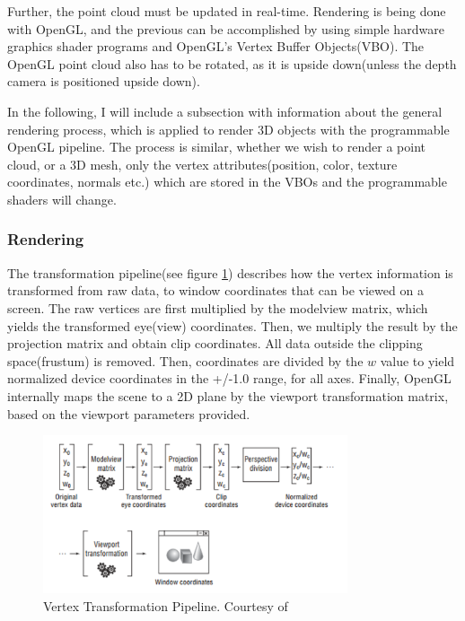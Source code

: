 \documentclass[]{article}
\begin{document}
Further, the point cloud must be updated in real-time. Rendering is being done with OpenGL, and the previous can be accomplished by using simple hardware graphics shader programs and OpenGL's Vertex Buffer Objects(VBO). The OpenGL point cloud also has to be rotated, as it is upside down(unless the depth camera is positioned upside down).

In the following, I will include a subsection with information about the general rendering process, which is applied to render 3D objects with the programmable OpenGL pipeline. The process is similar, whether we wish to render a point cloud, or a 3D mesh, only the vertex attributes(position, color, texture coordinates, normals etc.) which are stored in the VBOs and the programmable shaders will change.

\subsubsection{Rendering}

The transformation pipeline(see figure \ref{fig:TransformationPipeline}) describes how the vertex information is transformed from raw data, to window coordinates that can be viewed on a screen. The raw vertices are first multiplied by the modelview matrix, which yields the transformed eye(view) coordinates. Then, we multiply the result by the projection matrix and obtain clip coordinates. All data outside the clipping space(frustum) is removed. Then, coordinates are divided by the $w$ value to yield normalized device coordinates  in the +/-1.0 range, for all axes. Finally, OpenGL internally maps the scene to a 2D plane by the viewport transformation matrix, based on the viewport parameters provided.

\begin{figure}[hbtp]
    \centering
    \includegraphics[width=0.8\textwidth]{figures/TransformationPipeline.PNG}
    \caption{Vertex Transformation Pipeline. Courtesy of \cite{superbible}}
    \label{fig:TransformationPipeline}
\end{figure}
\end{document}
